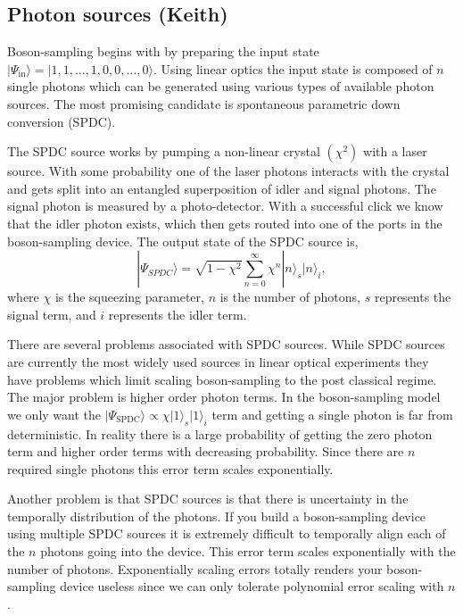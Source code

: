 \documentclass[aps,pra,twocolumn,amsmath,amssymb,nofootinbib,superscriptaddress]{revtex4}
\newcommand{\ket}[1]{|#1\rangle}
\begin{document}
\subsection{Photon sources (Keith)}

Boson-sampling begins with by preparing the input state $\ket{\Psi_{\mathrm{in}}}=\ket{1,1,\dots,1,0,0,\dots,0}$. Using linear optics the input state is composed of $n$ single photons which can be generated using various types of available photon sources. The most promising candidate is spontaneous parametric down conversion (SPDC). 

The SPDC source works by pumping a non-linear crystal $(\chi^2)$ with a laser source. With some probability one of the laser photons interacts with the crystal and gets split into an entangled superposition of idler and signal photons. The signal photon is measured by a photo-detector. With a successful click we know that the idler photon exists, which then gets routed into one of the ports in the boson-sampling device. The output state of the SPDC source is,
\begin{equation} \label{SPDC}
\ket{\Psi_{SPDC}} = \sqrt{1-\chi^2}\sum_{n=0}^{\infty}\chi^n\ket{n}_s\ket{n}_i,
\end{equation}
where $\chi$ is the squeezing parameter, $n$ is the number of photons, $s$ represents the signal term, and $i$ represents the idler term.

There are several problems associated with SPDC sources. While SPDC sources are currently the most widely used sources in linear optical experiments they have problems which limit scaling boson-sampling to the post classical regime. The major problem is higher order photon terms. In the boson-sampling model we only want the $\ket{\Psi_{\mathrm{SPDC}}}\propto\chi\ket{1}_s\ket{1}_i$ term and getting a single photon is far from deterministic. In reality there is a large probability of getting the zero photon term and higher order terms with decreasing probability. Since there are $n$ required single photons this error term scales exponentially. 

Another problem is that SPDC sources is that there is uncertainty in the temporally distribution of the photons. If you build a boson-sampling device using multiple SPDC sources it is extremely difficult to temporally align each of the $n$ photons going into the device. This error term scales exponentially with the number of photons. Exponentially scaling errors totally renders your boson-sampling device useless since we can only tolerate polynomial error scaling with $n$. 
\end{document}
